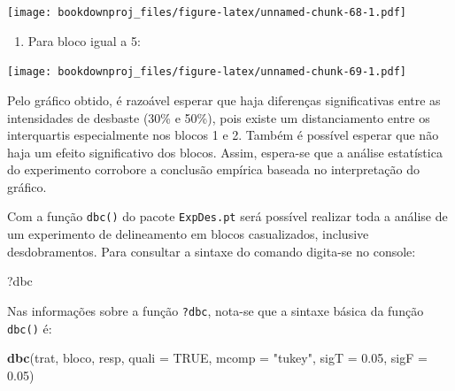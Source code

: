 \documentclass[
]{article}
\newenvironment{Shaded}{\begin{snugshade}}{\end{snugshade}}
\newcommand{\DataTypeTok}[1]{\textcolor[rgb]{0.13,0.29,0.53}{#1}}
\newcommand{\DecValTok}[1]{\textcolor[rgb]{0.00,0.00,0.81}{#1}}
\newcommand{\FloatTok}[1]{\textcolor[rgb]{0.00,0.00,0.81}{#1}}
\newcommand{\KeywordTok}[1]{\textcolor[rgb]{0.13,0.29,0.53}{\textbf{#1}}}
\newcommand{\NormalTok}[1]{#1}
\newcommand{\OperatorTok}[1]{\textcolor[rgb]{0.81,0.36,0.00}{\textbf{#1}}}
\newcommand{\OtherTok}[1]{\textcolor[rgb]{0.56,0.35,0.01}{#1}}
\newcommand{\StringTok}[1]{\textcolor[rgb]{0.31,0.60,0.02}{#1}}
\providecommand{\tightlist}{%
  \setlength{\itemsep}{0pt}\setlength{\parskip}{0pt}}
\begin{document}
\texttt{[image: bookdownproj\_files/figure-latex/unnamed-chunk-68-1.pdf]}

\begin{enumerate}
\def\labelenumi{\arabic{enumi}.}
\setcounter{enumi}{4}
\tightlist
\item
  Para bloco igual a 5:
\end{enumerate}

\begin{Shaded}
\end{Shaded}

\texttt{[image: bookdownproj\_files/figure-latex/unnamed-chunk-69-1.pdf]}

Pelo gráfico obtido, é razoável esperar que haja diferenças significativas entre as intensidades de desbaste (30\% e 50\%), pois existe um distanciamento entre os interquartis especialmente nos blocos 1 e 2. Também é possível esperar que não haja um efeito significativo dos blocos. Assim, espera-se que a análise estatística do experimento corrobore a conclusão empírica baseada no interpretação do gráfico.

Com a função \texttt{dbc()} do pacote \texttt{ExpDes.pt} será possível realizar toda a análise de um experimento de delineamento em blocos casualizados, inclusive desdobramentos. Para consultar a sintaxe do comando digita-se no console:

\begin{Shaded}
\begin{Highlighting}[]
\NormalTok{?dbc}
\end{Highlighting}
\end{Shaded}

Nas informações sobre a função \texttt{?dbc}, nota-se que a sintaxe básica da função \texttt{dbc()} é:

\begin{Shaded}
\begin{Highlighting}[]
\KeywordTok{dbc}\NormalTok{(trat, bloco, resp, }\DataTypeTok{quali =} \OtherTok{TRUE}\NormalTok{, }\DataTypeTok{mcomp =} \StringTok{"tukey"}\NormalTok{, }
    \DataTypeTok{sigT =} \FloatTok{0.05}\NormalTok{, }\DataTypeTok{sigF =} \FloatTok{0.05}\NormalTok{)}
\end{Highlighting}
\end{Shaded}
\end{document}
